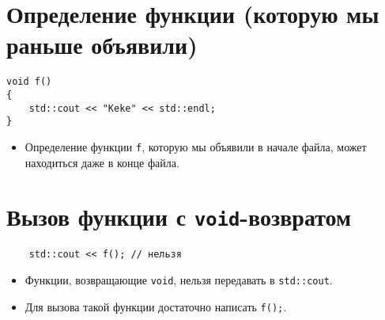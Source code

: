 \documentclass[10pt,a4paper]{article}
\begin{document}
\section{Определение функции (которую мы раньше объявили)}
\begin{lstlisting}
void f()
{ 
    std::cout << "Keke" << std::endl;
}
\end{lstlisting}

\begin{itemize}
  \item Определение функции \texttt{f}, которую мы объявили в начале файла, 
  может находиться даже в конце файла.
\end{itemize}

\section{Вызов функции с \texttt{void}-возвратом}
\begin{lstlisting}
    std::cout << f(); // нельзя
\end{lstlisting}

\begin{itemize}
  \item Функции, возвращающие \texttt{void}, нельзя передавать в \texttt{std::cout}.
  \item Для вызова такой функции достаточно написать \texttt{f();}.
\end{itemize}
\end{document}
